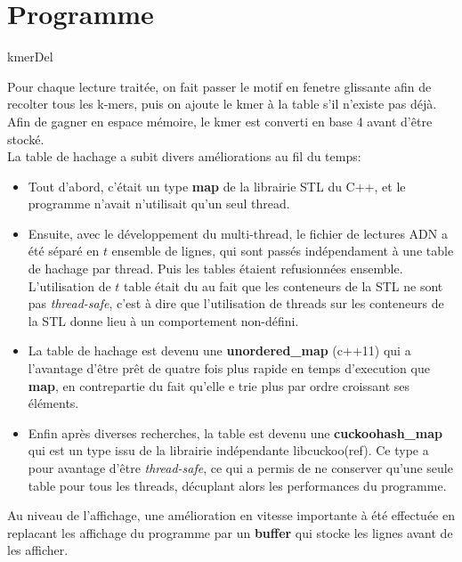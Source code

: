 \documentclass{report}
\begin{document}
    \section{Programme}
      \begin{algorithm}[H]{
        \caption{kmerDel}
      }\end{algorithm}
      Pour chaque lecture traitée, on fait passer le motif en fenetre glissante afin de recolter tous les k-mers, puis on ajoute le kmer à la table s'il n'existe pas déjà. Afin de gagner en espace mémoire, le kmer est converti en base 4 avant d'être stocké.\\
      La table de hachage a subit divers améliorations au fil du temps:
      \begin{itemize}
        \item Tout d'abord, c'était un type \textbf{map} de la librairie STL du C++, et le programme n'avait n'utilisait qu'un seul thread.
        \item Ensuite, avec le développement du multi-thread, le fichier de lectures ADN a été séparé en $t$ ensemble de lignes, qui sont passés indépendament à une table de hachage par thread. Puis les tables étaient refusionnées ensemble. L'utilisation de $t$ table était du au fait que les conteneurs de la STL ne sont pas \textit{thread-safe}, c'est à dire que l'utilisation de threads sur les conteneurs de la STL donne lieu à un comportement non-défini.
        \item La table de hachage est devenu une \textbf{unordered\_map} (c++11) qui a l'avantage d'être prêt de quatre fois plus rapide en temps d'execution que \textbf{map}, en contrepartie du fait qu'elle e trie plus par ordre croissant ses éléments.
        \item Enfin après diverses recherches, la table est devenu une \textbf{cuckoohash\_map} qui est un type issu de la librairie indépendante libcuckoo(ref). Ce type a pour avantage d'être \textit{thread-safe}, ce qui a permis de ne conserver qu'une seule table pour tous les threads, décuplant alors les performances du programme.
      \end{itemize}
      Au niveau de l'affichage, une amélioration en vitesse importante à été effectuée en replacant les affichage du programme par un \textbf{buffer} qui stocke les lignes avant de les afficher.
\end{document}
